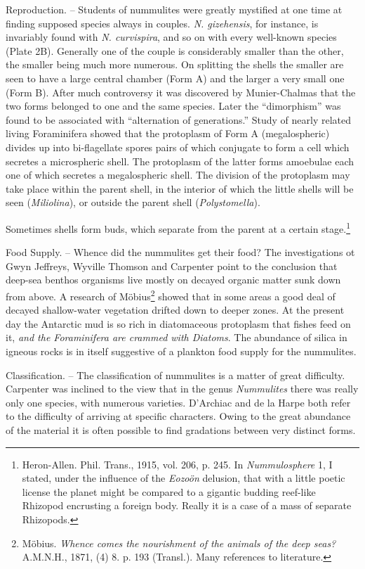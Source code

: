 \documentclass[a4paper, 12pt, oneside]{article}
\begin{document}
Reproduction. -- Students of nummulites were greatly mystified at one time at finding supposed species always in couples. \emph{N. gizehensis}, for instance, is invariably found with \emph{N. curvispira}, and so on with every well-known species (Plate 2B). Generally one of the couple is considerably smaller than the other, the smaller being much more numerous. On splitting the shells the smaller are seen to have a large central chamber (Form A) and the larger a very small one (Form B). After much controversy it was discovered by Munier-Chalmas that the two forms belonged to one and the same species. Later the ``dimorphism'' was found to be associated with ``alternation of generations.'' Study of nearly related living Foraminifera showed that the protoplasm of Form A (megalospheric) divides up into bi-flagellate spores pairs of which conjugate to form a cell which secretes a microspheric shell. The protoplasm of the latter forms amoebulae each one of which secretes a megalospheric shell. The division of the protoplasm may take place within the parent shell, in the interior of which the little shells will be seen (\emph{Miliolina}), or outside the parent shell (\emph{Polystomella}).

Sometimes shells form buds, which separate from the parent at a certain stage.\footnote{Heron-Allen. Phil. Trans., 1915, vol. 206, p. 245. In \emph{Nummulosphere} 1, I stated, under the influence of the \emph{Eozoön} delusion, that with a little poetic license the planet might be compared to a gigantic budding reef-like Rhizopod encrusting a foreign body. Really it is a case of a mass of separate Rhizopods.}

Food Supply. -- Whence did the nummulites get their food? The investigations ot Gwyn Jeffreys, Wyville Thomson and Carpenter point to the conclusion that deep-sea benthos organisms live mostly on decayed organic matter sunk down from above. A research of Möbius\footnote{Möbius. \emph{Whence comes the nourishment of the animals of the deep seas?} A.M.N.H., 1871, (4) 8. p. 193 (Transl.). Many references to literature.} showed that in some areas a good deal of decayed shallow-water vegetation drifted down to deeper zones. At the present day the Antarctic mud is so rich in diatomaceous protoplasm that fishes feed on it, \emph{and the Foraminifera are crammed with Diatoms}. The abundance of silica in igneous rocks is in itself suggestive of a plankton food supply for the nummulites.

Classification. -- The classification of nummulites is a matter of great difficulty. Carpenter was inclined to the view that in the genus \emph{Nummulites} there was really only one species, with numerous varieties. D'Archiac and de la Harpe both refer to the difficulty of arriving at specific characters. Owing to the great abundance of the material it is often possible to find gradations between very distinct forms.
\end{document}
